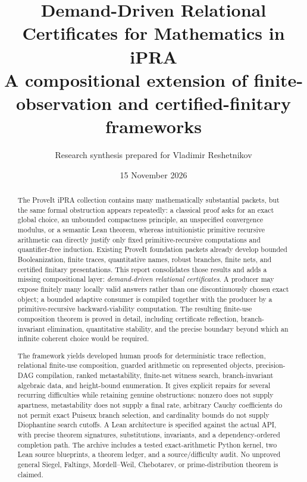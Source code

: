 \documentclass[11pt]{article}
\title{\textbf{Demand-Driven Relational Certificates for Mathematics in iPRA}\\[0.4em]
\large A compositional extension of finite-observation and certified-finitary frameworks}
\author{Research synthesis prepared for Vladimir Reshetnikov}
\date{15 November 2026}
\newcommand{\code}[1]{\texttt{\detokenize{#1}}}
\begin{document}
\maketitle

\begin{abstract}
The ProveIt iPRA collection contains many mathematically substantial packets, but the same formal obstruction appears repeatedly: a classical proof asks for an exact global choice, an unbounded compactness principle, an unspecified convergence modulus, or a semantic Lean theorem, whereas intuitionistic primitive recursive arithmetic can directly justify only fixed primitive-recursive computations and quantifier-free induction. Existing ProveIt foundation packets already develop bounded Booleanization, finite traces, quantitative names, robust branches, finite nets, and certified finitary presentations. This report consolidates those results and adds a missing compositional layer: \emph{demand-driven relational certificates}. A producer may expose finitely many locally valid answers rather than one discontinuously chosen exact object; a bounded adaptive consumer is compiled together with the producer by a primitive-recursive backward-viability computation. The resulting finite-use composition theorem is proved in detail, including certificate reflection, branch-invariant elimination, quantitative stability, and the precise boundary beyond which an infinite coherent choice would be required.

The framework yields developed human proofs for deterministic trace reflection, relational finite-use composition, guarded arithmetic on represented objects, precision-DAG compilation, ranked metastability, finite-net witness search, branch-invariant algebraic data, and height-bound enumeration. It gives explicit repairs for several recurring difficulties while retaining genuine obstructions: nonzero does not supply apartness, metastability does not supply a final rate, arbitrary Cauchy coefficients do not permit exact Puiseux branch selection, and cardinality bounds do not supply Diophantine search cutoffs. A Lean architecture is specified against the actual \code{ConciseIPRA} API, with precise theorem signatures, substitutions, invariants, and a dependency-ordered completion path. The archive includes a tested exact-arithmetic Python kernel, two Lean source blueprints, a theorem ledger, and a source/difficulty audit. No unproved general Siegel, Faltings, Mordell--Weil, Chebotarev, or prime-distribution theorem is claimed.
\end{abstract}
\end{document}
